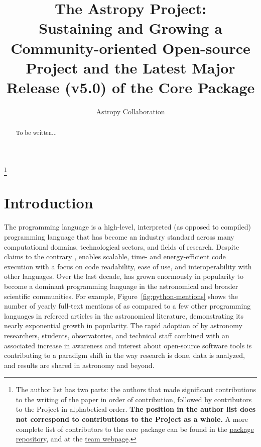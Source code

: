 \documentclass[modern]{aastex631}
\begin{document}
\draft{\today}

\title{The Astropy Project: \\
       Sustaining and Growing a Community-oriented Open-source Project and
       the Latest Major Release (v5.0) of the Core Package}


\author{Astropy Collaboration}
\noaffiliation
{\let\thefootnote\relax\footnote{{The author list has two parts: the authors that made significant contributions to the writing of the paper in order of contribution, followed by contributors to the \astropy Project in alphabetical order. \textbf{The position in the author list does not correspond to contributions to the \astropy Project as a whole.} A more complete list of contributors to the core package can be found in the \href{https://github.com/astropy/astropy/graphs/contributors}{package repository}, and at the \href{http://www.astropy.org/team.html}{\astropy team webpage}.}}}

% 

\begin{abstract}

    To be written...

\end{abstract}



\section{Introduction} \label{sec:intro}

The \python programming language is a high-level, interpreted (as opposed to
compiled) programming language that has become an industry standard across many
computational domains, technological sectors, and fields of research.
Despite claims to the contrary \citep{Portegies-Zwart:2020}, \python enables
scalable, time- and energy-efficient code execution \citep[e.g.,][]{Augier:2021}
with a focus on code readability, ease of use, and interoperability with other
languages.
Over the last decade, \python has grown enormously in popularity to become a
dominant programming language in the astronomical and broader scientific
communities.
For example, Figure~\ref{fig:python-mentions} shows the number of yearly
full-text mentions of \python as compared to a few other programming languages
in refereed articles in the astronomical literature, demonstrating its nearly
exponential growth in popularity.
The rapid adoption of \python by astronomy researchers, students, observatories,
and technical staff combined with an associated increase in awareness and
interest about open-source software tools is contributing to a paradigm shift in
the way research is done, data is analyzed, and results are shared in astronomy
and beyond.
\end{document}

